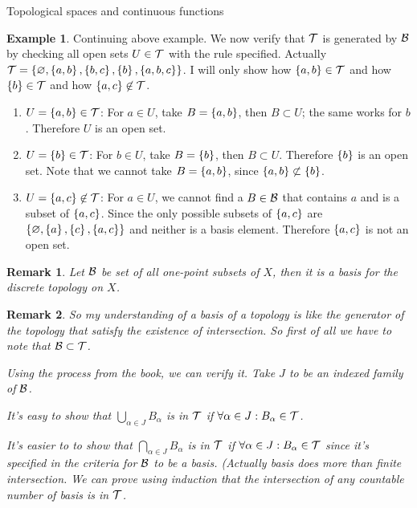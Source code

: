 \documentclass{report}
\let\emptyset\varnothing
\newtheorem*{remark}{Remark}
\theoremstyle{definition}
\newtheorem{example}{Example}[theorem]
\newcommand{\set}[1]{\ensuremath\left\{#1\right\}}
\begin{document}
\begin{chapter}{Topological spaces and continuous functions}
  \begin{example}
    Continuing above example. We now verify that $\mathcal{T}$ is generated by
    $\mathcal{B}$ by checking all open sets $U\in\mathcal{T}$ with the rule specified.
    Actually \\
    ${\T=\set{\emptyset, \set{a,b}, \set{b,c}, \set{b},
        \set{a,b,c}}}$. I will only show how $\set{a,b}\in\T$ and how
    $\set{b}\in\T$ and how $\set{a,c}\not\in\T$.

    \begin{enumerate}
    \item $U=\set{a,b}\in\T$: For $a\in U$, take $B=\set{a,b}$, then
      $B\subset U$; the same works for $b$. Therefore $U$ is an open
      set.
    \item $U=\set{b}\in\T$: For $b\in U$, take $B=\set{b}$, then
      $B\subset U$. Therefore $\set{b}$ is an open set. Note that we
      cannot take $B=\set{a,b}$, since $\set{a,b}\not\subset \set{b}$.
    \item $U=\set{a,c}\not\in\T$: For $a\in U$, we cannot find a
      $B\in\mathcal{B}$ that contains $a$ and is a subset of $\set{a,c}$. Since
      the only possible subsets of $\set{a,c}$ are $\set{\emptyset,
        \set{a}, \set{c}, \set{a,c}}$ and neither is a basis
      element. Therefore $\set{a,c}$ is not an open set.
    \end{enumerate}
  \end{example}
  \begin{remark}
    Let $\mathcal{B}$ be set of all one-point subsets of $X$, then it is a
    basis for the discrete topology on $X$.
  \end{remark}
  \begin{remark}
    So my understanding of a basis of a topology is like the generator
    of the topology that satisfy the existence of intersection. So
    first of all we have to note that $\mathcal{B}\subset\mathcal{T}$.

    Using the process from the book, we can verify it. Take $J$ to be
    an indexed family of $\mathcal{B}$.

    It's easy to show that $\bigcup_{\alpha\in J} B_\alpha$ is in $\mathcal{T}$
    if $\forall \alpha\in J : B_\alpha\in\mathcal{T}$.

    It's easier to to show that $\bigcap_{\alpha\in J} B_\alpha$ is in
    $\mathcal{T}$ if $\forall \alpha\in J: B_\alpha\in\mathcal{T}$ since it's specified
    in the criteria for $\mathcal{B}$ to be a basis. (Actually basis does more
    than finite intersection. We can prove using induction that the
    intersection of any countable number of basis is in $\mathcal{T}$.


\end{remark}
\end{chapter}
\end{document}
